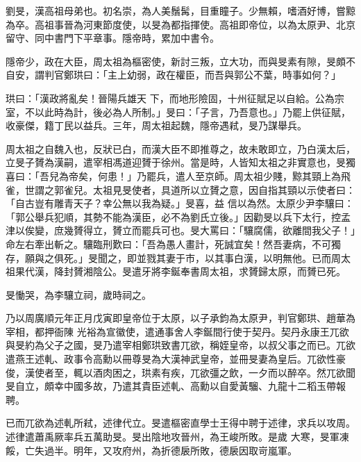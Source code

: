 
\begin{pinyinscope}

 劉旻，漢高祖母弟也。初名崇，為人美鬚髯，目重瞳子。少無賴，嗜酒好博，嘗黥為卒。高祖事晉為河東節度使，以旻為都指揮使。高祖即帝位，以為太原尹、北京留守、同中書門下平章事。隱帝時，累加中書令。



 隱帝少，政在大臣，周太祖為樞密使，新討三叛，立大功，而與旻素有隙，旻頗不自安，謂判官鄭珙曰：「主上幼弱，政在權臣，而吾與郭公不葉，時事如何？」



 珙曰：「漢政將亂矣！晉陽兵雄天
 下，而地形險固，十州征賦足以自給。公為宗室，不以此時為計，後必為人所制。」旻曰：「子言，乃吾意也。」乃罷上供征賦，收豪傑，籍丁民以益兵。三年，周太祖起魏，隱帝遇弒，旻乃謀舉兵。



 周太祖之自魏入也，反狀已白，而漢大臣不即推尊之，故未敢即立，乃白漢太后，立旻子贇為漢嗣，遣宰相馮道迎贇于徐州。當是時，人皆知太祖之非實意也，旻獨喜曰：「吾兒為帝矣，何患！」乃罷兵，遣人至京師。周太祖少賤，黥其頸上為飛雀，世謂之郭雀兒。太祖見旻使者，具道所以立贇之意，因自指其頸以示使者曰：「自古豈有雕青天子？幸公無以我為疑。」旻喜，益
 信以為然。太原少尹李驤曰：「郭公舉兵犯順，其勢不能為漢臣，必不為劉氏立後。」因勸旻以兵下太行，控孟津以俟變，庶幾贇得立，贇立而罷兵可也。旻大罵曰：「驤腐儒，欲離間我父子！」命左右牽出斬之。驤臨刑歎曰：「吾為愚人畫計，死誠宜矣！然吾妻病，不可獨存，願與之俱死。」旻聞之，即並戮其妻于市，以其事白漢，以明無他。已而周太祖果代漢，降封贇湘陰公。旻遣牙將李鋋奉書周太祖，求贇歸太原，而贇已死。



 旻慟哭，為李驤立祠，歲時祠之。



 乃以周廣順元年正月戊寅即皇帝位于太原，以子承鈞為太原尹，判官鄭珙、趙華為宰相，都押衙陳
 光裕為宣徽使，遣通事舍人李鋋間行使于契丹。契丹永康王兀欲與旻約為父子之國，旻乃遣宰相鄭珙致書兀欲，稱姪皇帝，以叔父事之而已。兀欲遣燕王述軋、政事令高勳以冊尊旻為大漢神武皇帝，並冊旻妻為皇后。兀欲性豪俊，漢使者至，輒以酒肉困之，珙素有疾，兀欲彊之飲，一夕而以醉卒。然兀欲聞旻自立，頗幸中國多故，乃遣其貴臣述軋、高勳以自愛黃騮、九龍十二稻玉帶報聘。



 已而兀欲為述軋所弒，述律代立。旻遣樞密直學士王得中聘于述律，求兵以攻周。述律遣蕭禹厥率兵五萬助旻。旻出陰地攻晉州，為王峻所敗。是歲
 大寒，旻軍凍餒，亡失過半。明年，又攻府州，為折德扆所敗，德扆因取岢嵐軍。




\end{pinyinscope}

